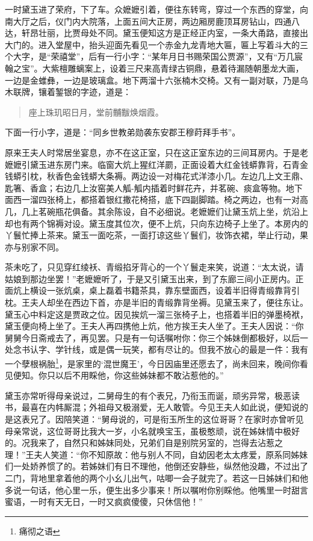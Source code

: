 \documentclass[12pt,oneside]{book}
\newenvironment{shici}{%
\begin{verse}%
\centering\large\hspace{12pt}}%
{\end{verse}}
\begin{document}
一时黛玉进了荣府，下了车。众嬷嬷引着，便往东转弯，穿过一个东西的穿堂，向南大厅之后，仪门内大院落，上面五间大正房，两边厢房鹿顶耳房钻山，四通八达，轩昂壮丽，比贾母处不同。黛玉便知这方是正经正内室，一条大甬路，直接出大门的。进入堂屋中，抬头迎面先看见一个赤金九龙青地大匾，匾上写着斗大的三个大字，是“荣禧堂”，后有一行小字：“某年月日书赐荣国公贾源”，又有“万几宸翰之宝”。大紫檀雕螭案上，设着三尺来高青绿古铜鼎，悬着待漏随朝墨龙大画，一边是金蜼彝，一边是玻璃盒。地下两溜十六张楠木交椅。又有一副对联，乃是乌木联牌，镶着錾银的字迹，道是：

\begin{shici}
座上珠玑昭日月，堂前黼黻焕烟霞。
\end{shici}


下面一行小字，道是：“同乡世教弟勋袭东安郡王穆莳拜手书”。

原来王夫人时常居坐宴息，亦不在这正室，只在这正室东边的三间耳房内。于是老嬷嬷引黛玉进东房门来。临窗大炕上猩红洋罽，正面设着大红金钱蟒靠背，石青金钱蟒引枕，秋香色金钱蟒大条褥。两边设一对梅花式洋漆小几。左边几上文王鼎、匙箸、香盒；右边几上汝窑美人觚-觚内插着时鲜花卉，并茗碗、痰盒等物。地下面西一溜四张椅上，都搭着银红撒花椅搭，底下四副脚踏。椅之两边，也有一对高几，几上茗碗瓶花俱备。其余陈设，自不必细说。老嬷嬷们让黛玉炕上坐，炕沿上却也有两个锦褥对设。黛玉度其位次，便不上炕，只向东边椅子上坐了。本房内的丫鬟忙捧上茶来。黛玉一面吃茶，一面打谅这些丫鬟们，妆饰衣裙，举止行动，果亦与别家不同。

茶未吃了，只见穿红绫袄、青缎掐牙背心的一个丫鬟走来笑，说道：“太太说，请姑娘到那边坐罢！”老嬷嬷听了，于是又引黛玉出来，到了东廊三间小正房内。正面炕上横设一张炕桌，桌上磊着书籍茶具，靠东壁面西，设着半旧得青缎靠背引枕。王夫人却坐在西边下首，亦是半旧的青缎靠背坐褥。见黛玉来了，便往东让。黛玉心中料定这是贾政之位。因见挨炕一溜三张椅子上，也搭着半旧的弹墨椅袱，黛玉便向椅上坐了。王夫人再四携他上炕，他方挨王夫人坐了。王夫人因说：“你舅舅今日斋戒去了，再见罢。只是有一句话嘱咐你：你三个姊妹倒都极好，以后一处念书认字、学针线，或是偶一玩笑，都有尽让的。但我不放心的最是一件：我有一个孽根祸胎\footnote{痛彻之语}，是家里的‘混世魔王’，今日因庙里还愿去了，尚未回来，晚间你看见便知。你只以后不用睬他，你这些姊妹都不敢沾惹他的。”

黛玉亦常听得母亲说过，二舅母生的有个表兄，乃衔玉而诞，顽劣异常，极恶读书，最喜在内帏厮混；外祖母又极溺爱，无人敢管。今见王夫人如此说，便知说的是这表兄了。因陪笑道：“舅母说的，可是衔玉所生的这位哥哥？在家时亦曾听见母亲常说，这位哥哥比我大一岁，小名就唤宝玉，虽极憨顽，说在姊妹情中极好的。况我来了，自然只和姊妹同处，兄弟们自是别院另室的，岂得去沾惹之理！”王夫人笑道：“你不知原故：他与别人不同，自幼因老太太疼爱，原系同姊妹们一处娇养惯了的。若姊妹们有日不理他，他倒还安静些，纵然他没趣，不过出了二门，背地里拿着他的两个小幺儿出气，咕唧一会子就完了。若这一日姊妹们和他多说一句话，他心里一乐，便生出多少事来！所以嘱咐你别睬他。他嘴里一时甜言蜜语，一时有天无日，一时又疯疯傻傻，只休信他！”
\end{document}
